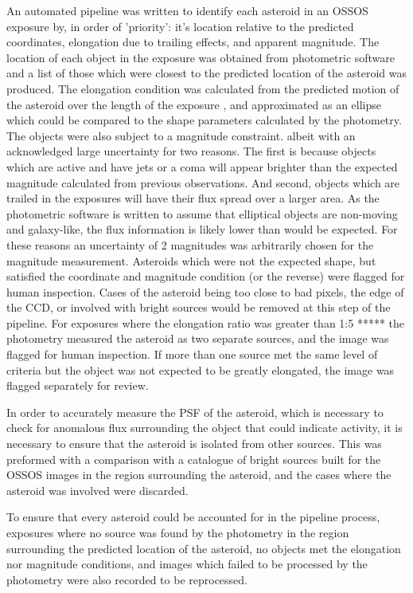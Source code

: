 \documentclass[iop,apj]{emulateapj}
\begin{document}
An automated pipeline was written to identify each asteroid in an OSSOS exposure by, in order of 'priority': it's location relative to the predicted coordinates,  elongation due to trailing effects, and apparent magnitude. The location of each object in the exposure was obtained from photometric software \citep{sep} and a list of those which were closest to the predicted location of the asteroid was produced. The elongation condition was calculated from the predicted motion of the asteroid over the length of the exposure \citep{jpl}, and approximated as an ellipse which could be compared to the shape parameters calculated by the photometry. The objects were also subject to a magnitude constraint. albeit with an acknowledged large uncertainty for two reasons. The first is because objects which are active and have jets or a coma will appear brighter than the expected magnitude calculated from previous observations. And second, objects which are trailed in the exposures will have their flux spread over a larger area. As the photometric software is written to assume that elliptical objects are non-moving and galaxy-like, the flux information is likely lower than would be expected. For these reasons an uncertainty of 2 magnitudes was arbitrarily chosen for the magnitude measurement.
Asteroids which were not the expected shape, but satisfied the coordinate and magnitude condition (or the reverse) were flagged for human inspection. Cases of the asteroid being too close to bad pixels, the edge of the CCD, or involved with bright sources would be removed at this step of the pipeline. For exposures where the elongation ratio was greater than 1:5 ***** the photometry measured the asteroid as two separate sources, and the image was flagged for human inspection. If more than one source met the same level of criteria but the object was not expected to be greatly elongated, the image was flagged separately for review.

In order to accurately measure the PSF of the asteroid, which is necessary to check for anomalous flux surrounding the object that could indicate activity, it is necessary to ensure that the asteroid is isolated from other sources. This was preformed with a comparison with a catalogue of bright sources built for the OSSOS images \citep{ossos} in the region surrounding the asteroid, and the cases where the asteroid was involved were discarded.

To ensure that every asteroid could be accounted for in the pipeline process, exposures where no source was found by the photometry in the region surrounding the predicted location of the asteroid, no objects met the elongation nor magnitude conditions, and images which failed to be processed by the photometry were also recorded to be reprocessed.
\end{document}
